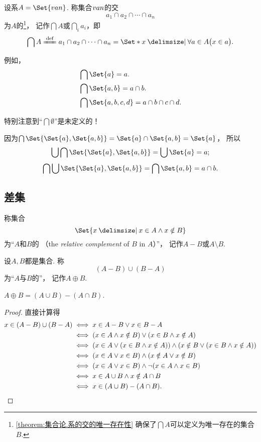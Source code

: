 \begin{definition}
设系\(A = \Set{\v{a}{n}}\).
称集合\(v{a}{n}\)的交\[
	a_1 \cap a_2 \cap \dotsb \cap a_n
\]为\(A\)的\footnote{%
\cref{theorem:集合论.系的交的唯一存在性} 确保了\(\bigcap A\)可以定义为唯一存在的集合\(B\).
}，%
记作\(\bigcap A\)或\(\bigcap\limits_i a_i\)，即\[
	\bigcap A
	\defeq
	a_1 \cap a_2 \cap \dotsb \cap a_n
	= \Set*{ x \given \forall a \in A \bigl(x \in a\bigr) }.
\]
\end{definition}

例如，
\begin{align*}
	&\bigcap\Set{a} = a. \\
	&\bigcap\Set{a,b} = a \cap b. \\
	&\bigcap\Set{a,b,c,d} = a \cap b \cap c \cap d.
\end{align*}

特别注意到“\(\bigcap\emptyset\)”是未定义的！

\begin{example}
因为\(\bigcap\Set{ \Set{a}, \Set{a,b} } = \Set{a} \cap \Set{a,b} = \Set{a}\)，%
所以\[
\bigcup \bigcap \Set{ \Set{a}, \Set{a,b} } = \bigcup \Set{a} = a;
\]\[
\bigcap \bigcup \Set{ \Set{a}, \Set{a,b} } = \bigcap \Set{a,b} = a \cap b.
\]
\end{example}

\subsection{差集}
\begin{definition}
称集合\[
	\Set{ x \given x \in A \land x \notin B }
\]为“\(A\)和\(B\)的%
（the \emph{relative complement} of \(B\) in \(A\)）”，
记作\(A - B\)或\(A \setminus B\).
\end{definition}

\begin{definition}
设\(A,B\)都是集合.
称\[
	(A-B)\cup(B-A)
\]为“\(A\)与\(B\)的”，
记作\(A \oplus B\).
\end{definition}

\begin{theorem}
\(A \oplus B = (A \cup B)-(A \cap B)\).
\begin{proof}
直接计算得
\begin{align*}
	x\in(A-B)\cup(B-A)
	&\iff x \in A-B \lor x \in B-A \\
	&\iff (x \in A \land x \notin B) \lor (x \in B \land x \notin A) \\
	&\iff (x \in A \lor (x \in B \land x \notin A)) \land (x \notin B \lor (x \in B \land x \notin A)) \\
	&\iff (x \in A \lor x \in B) \land (x \notin A \lor x \notin B) \\
	&\iff (x \in A \lor x \in B) \land \neg(x \in A \land x \in B) \\
	&\iff x \in A \cup B \land x \notin A \cap B \\
	&\iff x\in(A \cup B)-(A \cap B).
	\qedhere
\end{align*}
\end{proof}
\end{theorem}

